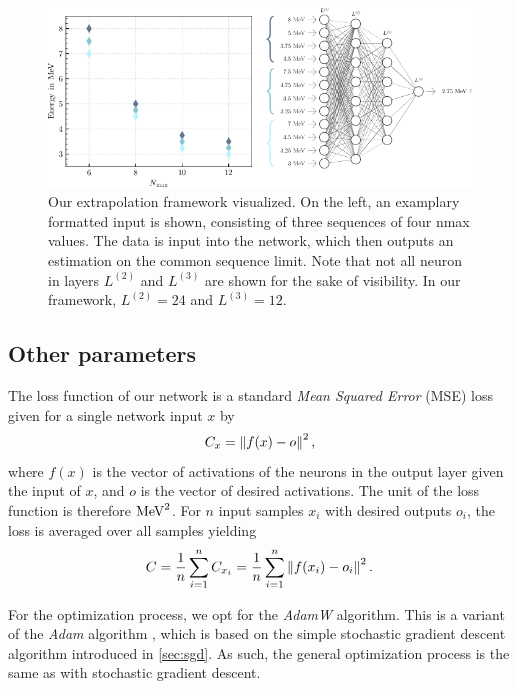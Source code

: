 \begin{figure}[H]
  \centering
  \includegraphics[width=\textwidth]{media/netviz.pdf}
  \caption{Our extrapolation framework visualized. On the left, an examplary formatted input is shown, consisting of three sequences of four nmax values. The data is input into the network, which then outputs an estimation on the common sequence limit. Note that not all neuron in layers $L^{(2)}$ and $L^{(3)}$ are shown for the sake of visibility. In our framework, $L^{(2)} = 24$ and $L^{(3)} = 12$.}
  \label{fig:dataflow}
\end{figure}
\subsection{Other parameters}
The loss function of our network is a standard \textit{Mean Squared Error} (MSE) loss given for a single network input $x$ by
\begin{equation}
  C_x = \left\lVert f(x)-o\right\rVert^2,
\end{equation}
where $f(x)$ is the vector of activations of the neurons in the output layer given the input of $x$, and $o$ is the vector of desired activations. The unit of the loss function is therefore $\si[]{\mega\electronvolt\squared}$. For $n$ input samples $x_i$ with desired outputs $o_i$, the loss is averaged over all samples yielding
\begin{equation}
  C = \frac{1}{n}\sum_{i=1}^n C_{x_i}=\frac{1}{n} \sum_{i=1}^{n}\left\lVert f(x_i)-o_i\right\rVert^2.
\end{equation}

For the optimization process, we opt for the \textit{AdamW} algorithm. This is a variant of the \textit{Adam} algorithm \cite{adamw, adam}, which is based on the simple stochastic gradient descent algorithm introduced in \autoref{sec:sgd}. As such, the general optimization process is the same as with stochastic gradient descent.

